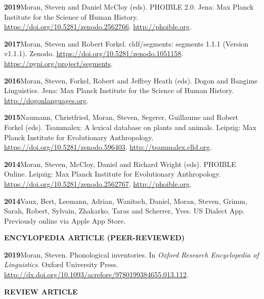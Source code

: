 \documentclass[11pt]{article}
\newcommand{\hangpara}{
 \setlength{\parindent}{0in} %
 \hangindent=0.42in %
}
\begin{document}
\vskip 6pt
\hangpara
{\bf 2019}\hspace{1ex}Moran, Steven and Daniel McCloy (eds). PHOIBLE 2.0. Jena: Max Planck Institute for the Science of Human History. \url{https://doi.org/10.5281/zenodo.2562766}. \url{http://phoible.org}.

\vskip 6pt
\hangpara
{\bf 2017}\hspace{1ex}Moran, Steven and Robert Forkel. cldf/segments: segments 1.1.1 (Version v1.1.1). Zenodo. \url{https://doi.org/10.5281/zenodo.1051158}. \url{https://pypi.org/project/segments}.

\vskip 6pt
\hangpara
{\bf 2016}\hspace{1ex}Moran, Steven, Forkel, Robert and Jeffrey Heath (eds). Dogon and Bangime Linguistics. Jena: Max Planck Institute for the Science of Human History. \url{http://dogonlanguages.org}.

\vskip 6pt
\hangpara
{\bf 2015}\hspace{1ex}Naumann, Christfried, Moran, Steven, Segerer, Guillaume and Robert Forkel (eds). Tsammalex: A lexical database on plants and animals. Leipzig: Max Planck Institute for Evolutionary Anthropology. \url{https://doi.org/10.5281/zenodo.596403}. \url{http://tsammalex.clld.org}.

\vskip 6pt
\hangpara
{\bf 2014}\hspace{1ex}Moran, Steven, McCloy, Daniel and Richard Wright (eds). PHOIBLE Online. Leipzig: Max Planck Institute for Evolutionary Anthropology. \url{https://doi.org/10.5281/zenodo.2562767}. \url{http://phoible.org}.

\vskip 6pt
\hangpara
{\bf 2014}\hspace{1ex}Vaux, Bert, Leemann, Adrian, Wanitsch, Daniel, Moran, Steven, Grimm, Sarah, Robert, Sylvain, Zhakarko, Taras and Scherrer, Yves. US Dialect App. Previously online via Apple App Store. %


\vskip 20pt
\begin{flushleft}
{\bf ENCYLOPEDIA ARTICLE (PEER-REVIEWED)}
\end{flushleft}

\hangpara
{\bf 2019}\hspace{1ex}Moran, Steven. Phonological inventories. In \textit{Oxford Research Encyclopedia of Linguistics}. Oxford University Press. \url{http://dx.doi.org/10.1093/acrefore/9780199384655.013.112}.

\vskip 20pt
\begin{flushleft}
{\bf REVIEW ARTICLE}
\end{flushleft}
\end{document}
